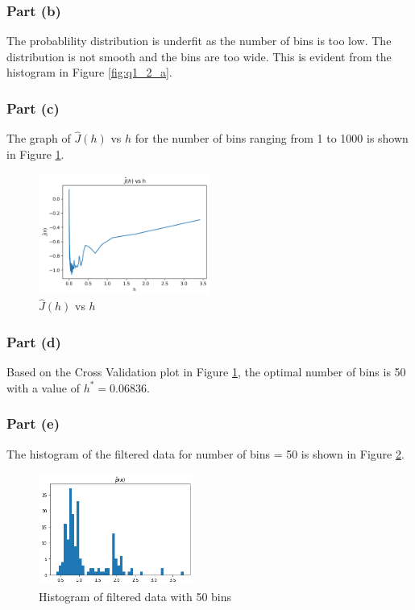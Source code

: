 \subsubsection{Part (b)}

The probablility distribution is underfit as the number of bins is too low. The distribution is not smooth and the bins are too wide. This is evident from the histogram in Figure \ref{fig:q1_2_a}.

\subsubsection{Part (c)}

The graph of $\hat{J}(h)$ vs $h$ for the number of bins ranging from 1 to 1000 is shown in Figure \ref{fig:q1_2_c}.

\begin{figure}[H]
    \centering
    \includegraphics[width=0.5\textwidth]{../q1/images/crossvalidation.png}
    \caption{$\hat{J}(h)$ vs $h$}
    \label{fig:q1_2_c}
\end{figure}

\subsubsection{Part (d)}

Based on the Cross Validation plot in Figure \ref{fig:q1_2_c}, the optimal number of bins is 50 with a value of $h^\ast = 0.06836$.

\subsubsection{Part (e)}

The histogram of the filtered data for number of bins = 50 is shown in Figure \ref{fig:q1_2_e}.

\begin{figure}[H]
    \centering
    \includegraphics[width=0.45\textwidth]{../q1/images/optimalhistogram.png}
    \caption{Histogram of filtered data with 50 bins}
    \label{fig:q1_2_e}
\end{figure}
    